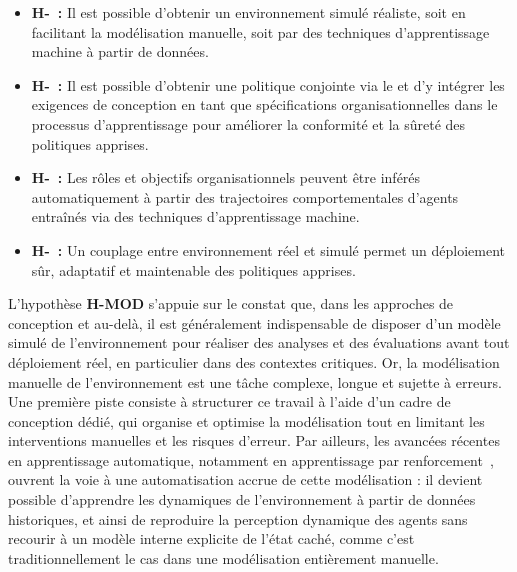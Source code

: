 \begin{itemize}
  \item \textbf{H-~:} Il est possible d'obtenir un environnement simulé réaliste, soit en facilitant la modélisation manuelle, soit par des techniques d'apprentissage machine à partir de données.
  \item \textbf{H-~:} Il est possible d'obtenir une politique conjointe via le  et d'y intégrer les exigences de conception en tant que spécifications organisationnelles dans le processus d'apprentissage pour améliorer la conformité et la sûreté des politiques apprises.
  \item \textbf{H-~:} Les rôles et objectifs organisationnels peuvent être inférés automatiquement à partir des trajectoires comportementales d'agents entraînés via des techniques d'apprentissage machine.
  \item \textbf{H-~:} Un couplage entre environnement réel et simulé permet un déploiement sûr, adaptatif et maintenable des politiques apprises.
\end{itemize}

\noindent L'hypothèse \textbf{H-MOD} s'appuie sur le constat que, dans les approches de conception  et au-delà, il est généralement indispensable de disposer d'un modèle simulé de l'environnement pour réaliser des analyses et des évaluations avant tout déploiement réel, en particulier dans des contextes critiques. Or, la modélisation manuelle de l'environnement est une tâche complexe, longue et sujette à erreurs. Une première piste consiste à structurer ce travail à l'aide d'un cadre de conception dédié, qui organise et optimise la modélisation tout en limitant les interventions manuelles et les risques d'erreur. Par ailleurs, les avancées récentes en apprentissage automatique, notamment en apprentissage par renforcement~\cite{ha2018recurrent}, ouvrent la voie à une automatisation accrue de cette modélisation : il devient possible d'apprendre les dynamiques de l'environnement à partir de données historiques, et ainsi de reproduire la perception dynamique des agents sans recourir à un modèle interne explicite de l'état caché, comme c'est traditionnellement le cas dans une modélisation entièrement manuelle.

\medskip


